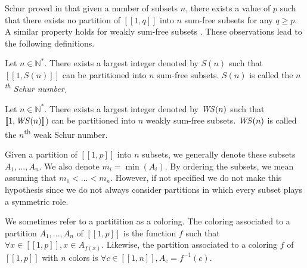 \par
Schur proved in \cite{Schur1917} that given a number of subsets \(n\), there exists a value of \(p\)
such that there exists no partition of \([\![1,q]\!]\) into \(n\) sum-free subsets for any \(q \geqslant p\). A similar
property holds for weakly sum-free subsets \cite{Irving1973}. These observations lead to the following definitions.

\begin{definition}
Let \(n \in \mathbb{N}^*\). There exists a largest integer denoted by \(S(n)\) such that \([\![1, S(n)]\!]\) can be
 partitioned into \(n\) sum-free subsets. \(S(n)\) is called the \textit{\(n\)\textsuperscript{th} Schur number}.
\end{definition}

\begin{definition}
Let \(n \in \mathbb{N}^*\). There exists a largest integer denoted by \(\mathit{WS} (n)\) such that \([\![1, \mathit{WS} (n)]\!]\)) 
can be partitioned into \(n\) weakly sum-free subsets. \(\mathit{WS}(n)\) is called the \(n\)\textsuperscript{th} weak Schur 
number.
\end{definition}

Given a partition of \([\![1, p]\!]\) into \(n\) subsets, we generally denote these subsets \(A_1, ..., A_n\). We also denote
\(m_i = \min(A_i)\). By ordering the subsets, we mean assuming that \(m_1 < ... < m_n\). However, if not specified we do 
not make this hypothesis since we do not always consider partitions in which every subset plays a symmetric role.

\begin{definition}
We sometimes refer to a partitition as a coloring. The coloring associated to a partition \(A_1, ..., A_n\) of 
\([\![1, p]\!]\) is the function \(f\) such that \(\forall x \in [\![1, p]\!], x \in A_{f(x)}\). Likewise, the partition associated to
a coloring \(f\) of \([\![1, p]\!]\) with \(n\) colors is \(\forall c \in [\![1, n]\!], A_c = f^{-1}(c)\).
\end{definition}
